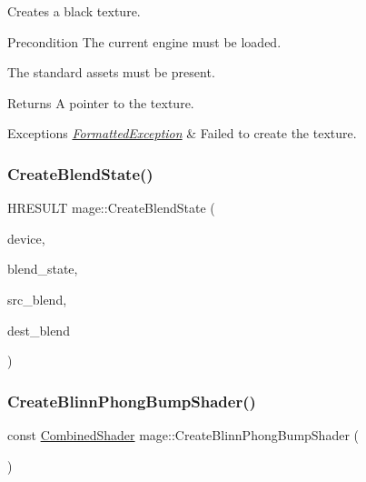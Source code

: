 Creates a black texture.

\begin{DoxyPrecond}{Precondition}
The current engine must be loaded. 

The standard assets must be present. 
\end{DoxyPrecond}
\begin{DoxyReturn}{Returns}
A pointer to the texture. 
\end{DoxyReturn}

\begin{DoxyExceptions}{Exceptions}
{\em \hyperlink{structmage_1_1_formatted_exception}{Formatted\+Exception}} & Failed to create the texture. \\
\hline
\end{DoxyExceptions}
\hypertarget{namespacemage_ad2c838028ab44521fe1818721dd7ade1}{}\label{namespacemage_ad2c838028ab44521fe1818721dd7ade1} 
\subsubsection{\texorpdfstring{Create\+Blend\+State()}{CreateBlendState()}}
{\footnotesize\ttfamily H\+R\+E\+S\+U\+LT mage\+::\+Create\+Blend\+State (\begin{DoxyParamCaption}\item[{I\+D3\+D11\+Device2 $\ast$}]{device,  }\item[{I\+D3\+D11\+Blend\+State $\ast$$\ast$}]{blend\+\_\+state,  }\item[{D3\+D11\+\_\+\+B\+L\+E\+ND}]{src\+\_\+blend,  }\item[{D3\+D11\+\_\+\+B\+L\+E\+ND}]{dest\+\_\+blend }\end{DoxyParamCaption})}

\hypertarget{namespacemage_a7555e8774e97435c103e36ff4db24792}{}\label{namespacemage_a7555e8774e97435c103e36ff4db24792} 
\subsubsection{\texorpdfstring{Create\+Blinn\+Phong\+Bump\+Shader()}{CreateBlinnPhongBumpShader()}}
{\footnotesize\ttfamily const \hyperlink{structmage_1_1_combined_shader}{Combined\+Shader} mage\+::\+Create\+Blinn\+Phong\+Bump\+Shader (\begin{DoxyParamCaption}{ }\end{DoxyParamCaption})}

